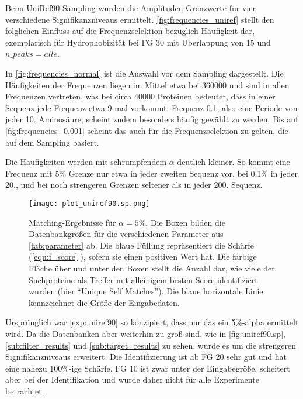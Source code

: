         Beim UniRef90 Sampling wurden die Amplituden-Grenzwerte für vier verschiedene Signifikanzniveaus ermittelt. \autoref{fig:frequencies_uniref} stellt den folglichen Einfluss auf die Frequenzselektion bezüglich Häufigkeit dar, exemplarisch für Hydrophobizität bei \ac{FG} 30 mit Überlappung von 15 und $n\_peaks = alle$.

        In \autoref{fig:frequencies_normal} ist die Auswahl vor dem Sampling dargestellt. Die Häufigkeiten der Frequenzen liegen im Mittel etwa bei 360000 und sind in allen Frequenzen vertreten, was bei circa 40000 Proteinen bedeutet, dass in einer Sequenz jede Frequenz etwa 9-mal vorkommt. Frequenz 0.1, also eine Periode von jeder 10. Aminosäure, scheint zudem besonders häufig gewählt zu werden. Bis auf \autoref{fig:frequencies_0.001} scheint das auch für die Frequenzselektion zu gelten, die auf dem Sampling basiert.

        Die Häufigkeiten werden mit schrumpfendem $\alpha$ deutlich kleiner. So kommt eine Frequenz mit 5\% Grenze nur etwa in jeder zweiten Sequenz vor, bei 0.1\% in jeder 20., und bei noch strengeren Grenzen seltener als in jeder 200. Sequenz.

        \begin{figure}[H]
            \centering
            \texttt{[image: plot\_uniref90.sp.png]}
            \caption[Single-Protein-Matching ]{Matching-Ergebnisse für $\alpha=5\%$. Die Boxen bilden die Datenbankgrößen für die verschiedenen Parameter aus \autoref{tab:parameter} ab. Die blaue Füllung repräsentiert die Schärfe (\autoref{equ:f_score} ), sofern sie einen positiven Wert hat. Die farbige Fläche über und unter den Boxen stellt die Anzahl dar, wie viele der Suchproteine als Treffer mit alleinigem besten Score identifiziert wurden (hier ``Unique Self Matches''). Die blaue horizontale Linie kennzeichnet die Größe der Eingabedaten.}
            \label{fig:uniref90.sp}
        \end{figure}

        Ursprünglich war \autoref{exp:uniref90} so konzipiert, dass nur das ein 5\%-alpha ermittelt wird. Da die Datenbanken aber weiterhin zu groß sind, wie in \autoref{fig:uniref90.sp}, \autoref{sub:filter_results} und \autoref{sub:target_results} zu sehen, wurde es um die strengeren Signifikanzniveaus erweitert. Die Identifizierung ist ab \ac{FG} 20 sehr gut und hat eine nahezu 100\%-ige Schärfe. \ac{FG} 10 ist zwar unter der Eingabegröße, scheitert aber bei der Identifikation und wurde daher nicht für alle Experimente betrachtet. 
    
